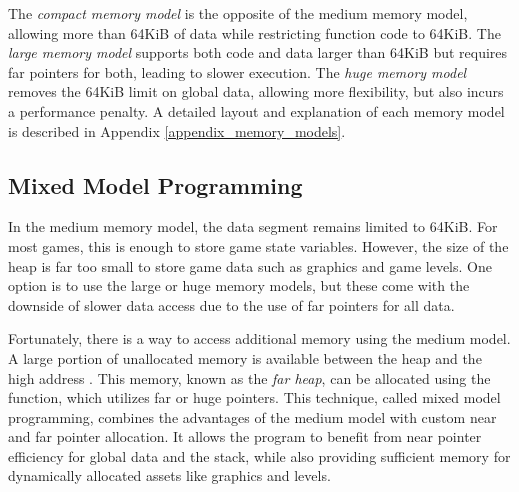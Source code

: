 \documentclass[book.tex]{subfiles}
\begin{document}
\par
The \textit{compact memory model} is the opposite of the medium memory model, allowing more than 64KiB of data while restricting function code to 64KiB. The \textit{large memory model} supports both code and data larger than 64KiB but requires far pointers for both, leading to slower execution. The \textit{huge memory model} removes the 64KiB limit on global data, allowing more flexibility, but also incurs a performance penalty. A detailed layout and explanation of each memory model is described in Appendix \ref{appendix_memory_models}.\\

\subsection{Mixed Model Programming}

In the medium memory model, the data segment remains limited to 64KiB. For most games, this is enough to store game state variables. However, the size of the heap is far too small to store game data such as graphics and game levels. One option is to use the large or huge memory models, but these come with the downside of slower data access due to the use of far pointers for all data.\\


\par
Fortunately, there is a way to access additional memory using the medium model. A large portion of unallocated memory is available between the heap and the high address . This memory, known as the \textit{far heap}, can be allocated using the  function, which utilizes far or huge pointers. This technique, called mixed model programming, combines the advantages of the medium model with custom near and far pointer allocation. It allows the program to benefit from near pointer efficiency for global data and the stack, while also providing sufficient memory for dynamically allocated assets like graphics and levels.\\
\end{document}
